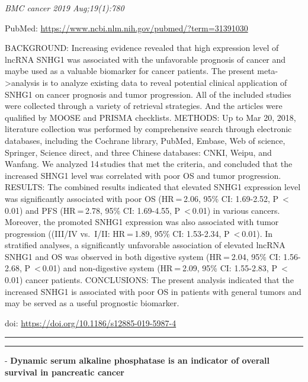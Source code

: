 \documentclass[]{article}
\begin{document}
\emph{BMC cancer 2019 Aug;19(1):780}

PubMed: \url{https://www.ncbi.nlm.nih.gov/pubmed/?term=31391030}

BACKGROUND: Increasing evidence revealed that high expression level of
lncRNA SNHG1 was associated with the unfavorable prognosis of cancer and
maybe used as a valuable biomarker for cancer patients. The present
meta-\textgreater{}analysis is to analyze existing data to reveal
potential clinical application of SNHG1 on cancer prognosis and tumor
progression. All of the included studies were collected through a
variety of retrieval strategies. And the articles were qualified by
MOOSE and PRISMA checklists. METHODS: Up to Mar 20, 2018, literature
collection was performed by comprehensive search through electronic
databases, including the Cochrane library, PubMed, Embase, Web of
science, Springer, Science direct, and three Chinese databases: CNKI,
Weipu, and Wanfang. We analyzed 14 studies that met the criteria, and
concluded that the increased SHNG1 level was correlated with poor OS and
tumor progression. RESULTS: The combined results indicated that elevated
SNHG1 expression level was significantly associated with poor OS
(HR = 2.06, 95\% CI: 1.69-2.52, P~\textless{} 0.01) and PFS (HR = 2.78,
95\% CI: 1.69-4.55, P~\textless{} 0.01) in various cancers. Moreover,
the promoted SNHG1 expression was also associated with tumor progression
((III/IV vs.~I/II: HR = 1.89, 95\% CI: 1.53-2.34, P~\textless{} 0.01).
In stratified analyses, a significantly unfavorable association of
elevated lncRNA SNHG1 and OS was observed in both digestive system
(HR = 2.04, 95\% CI: 1.56-2.68, P~\textless{} 0.01) and non-digestive
system (HR = 2.09, 95\% CI: 1.55-2.83, P~\textless{} 0.01) cancer
patients. CONCLUSIONS: The present analysis indicated that the increased
SNHG1 is associated with poor OS in patients with general tumors and may
be served as a useful prognostic biomarker.

doi: \url{https://doi.org/10.1186/s12885-019-5987-4}

{}

{}

\begin{center}\rule{0.5\linewidth}{\linethickness}\end{center}

\begin{center}\rule{0.5\linewidth}{\linethickness}\end{center}

 - \textbf{Dynamic serum alkaline phosphatase is an indicator of overall
survival in pancreatic cancer}
\end{document}
